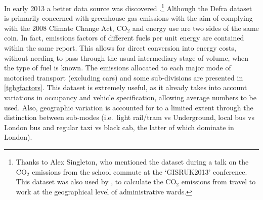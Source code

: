 \documentclass[a4paper, 11pt, twoside]{Thesis}
\begin{document}
In early 2013 a better data source was discovered
\citep{Defra2011}.\footnote{Thanks to Alex Singleton, who mentioned the dataset
during a talk on the CO$_2$ emissions from the school commute at the `GISRUK2013'
conference. This dataset was also used by \citet{smith2011polycentricity},
to calculate the CO$_2$ emissions from travel to work at the geographical
level of administrative wards.
}
Although the Defra dataset is primarily concerned with greenhouse gas
emissions with the aim of complying with the 2008 Climate Change Act,
CO$_2$ and energy use are two sides of the same coin. In fact,
emissions factors of different fuels per unit energy are contained within the
same report. This allows
for direct conversion into energy costs, without needing to pass
through the usual intermediary stage of volume, when the type of fuel is known.
The emissions allocated
to each major mode of motorised transport (excluding cars)
and some sub-divisions are presented in \cref{tghgfactors}.
This dataset is extremely useful, as it already takes into account
variations in occupancy and vehicle specification, allowing average numbers to be used.
Also, geographic variation
is accounted for to a limited extent through the distinction between sub-modes
(i.e.~light rail/tram vs Underground, local bus vs London bus and regular taxi
vs black cab, the latter of which dominate in London).
\end{document}
